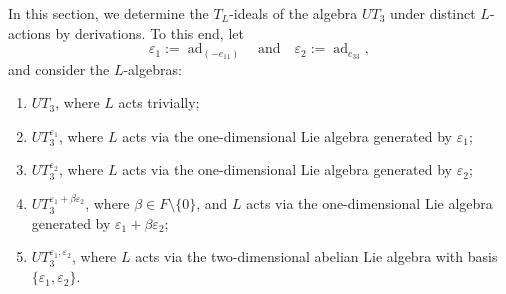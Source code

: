 \documentclass[a4paper,reqno]{amsart}
\theoremstyle{definition}
\numberwithin{equation}{section}
\numberwithin{theorem}{section}
\DeclareMathOperator{\ad}{ad}
\begin{document}
In this section, we determine the $T_L$-ideals of the algebra $ UT_3 $ under distinct $L$-actions by derivations. To this end, let 
$$
\varepsilon_1 := \ad_{(-e_{11})} \quad \text{and} \quad \varepsilon_2 := \ad_{e_{33}},
$$
and consider the $L$-algebras:
\begin{enumerate}
    \item $ UT_3 $, where $ L $ acts trivially;
    \vspace{1mm}
    
    \item $ UT_3^{\varepsilon_1} $, where $ L $ acts via the one-dimensional Lie algebra generated by $ \varepsilon_1 $;
    \vspace{1mm}
    
    \item $ UT_3^{\varepsilon_2} $, where $ L $ acts via the one-dimensional Lie algebra generated by $ \varepsilon_2 $;

    
    
  \vspace{1mm}
  
  \item $ UT_3^{\varepsilon_1+ \beta\varepsilon_2} $, where $\beta \in F\setminus \{0\}$, and $ L $ acts via the one-dimensional Lie algebra generated by $ \varepsilon_1+ \beta\varepsilon_2$;
    


    \vspace{1mm}

    
    \item $ UT_3^{\varepsilon_1, \varepsilon_2} $, where $ L $ acts via the two-dimensional abelian Lie algebra with basis $ \{ \varepsilon_1, \varepsilon_2 \} $.
\end{enumerate}
\end{document}
